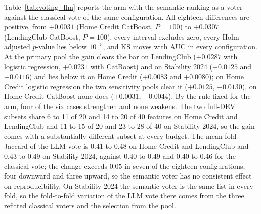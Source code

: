 \documentclass[final,5p,twocolumn]{elsarticle}
\begin{document}
Table~\ref{tab:voting_llm} reports the arm with the semantic ranking as a voter against the classical vote of the same configuration. All eighteen differences are positive, from $+0.0031$ (Home Credit CatBoost, $P=100$) to $+0.0307$ (LendingClub CatBoost, $P=100$), every interval excludes zero, every Holm-adjusted $p$-value lies below $10^{-5}$, and KS moves with AUC in every configuration. At the primary pool the gain clears the bar on LendingClub ($+0.0287$ with logistic regression, $+0.0231$ with CatBoost) and on Stability 2024 ($+0.0125$ and $+0.0116$) and lies below it on Home Credit ($+0.0083$ and $+0.0080$); on Home Credit logistic regression the two sensitivity pools clear it ($+0.0125$, $+0.0130$), on Home Credit CatBoost none does ($+0.0031$, $+0.0044$). By the rule fixed for the arm, four of the six cases strengthen and none weakens. The two full-DEV subsets share 6 to 11 of 20 and 14 to 20 of 40 features on Home Credit and LendingClub and 11 to 15 of 20 and 23 to 28 of 40 on Stability 2024, so the gain comes with a substantially different subset at every budget. The mean fold Jaccard of the LLM vote is 0.41 to 0.48 on Home Credit and LendingClub and 0.43 to 0.49 on Stability 2024, against 0.40 to 0.49 and 0.40 to 0.46 for the classical vote; the change exceeds $0.05$ in seven of the eighteen configurations, four downward and three upward, so the semantic voter has no consistent effect on reproducibility. On Stability 2024 the semantic voter is the same list in every fold, so the fold-to-fold variation of the LLM vote there comes from the three refitted classical voters and the selection from the pool.
\end{document}
